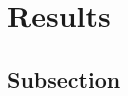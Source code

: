 \documentclass[main]{subfiles}
\begin{document}
\section{Results}
\subsection{Subsection}
\end{document}
